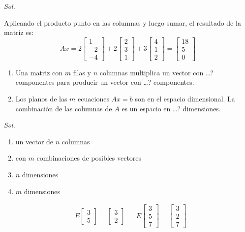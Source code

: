 \textit{ Sol. }

Aplicando el producto punto en las columnas y luego sumar, el resultado de la matriz es:
\begin{equation*}
	Ax= 2\begin{bmatrix}
		1 \\-2\\-4
	\end{bmatrix}+2\begin{bmatrix}
		2 \\3\\1
	\end{bmatrix}+3\begin{bmatrix}
		4 \\1\\2
	\end{bmatrix}=\begin{bmatrix}
		18 \\5\\0
	\end{bmatrix}
\end{equation*}

\begin{problem}
	\begin{enumerate}
		\item  Una matriz con $m$ filas y $n$ columnas multiplica un vector con \dots ? componentes para producir un vector con \dots ? componentes.
		\item Los planos de las $m$ ecuaciones $Ax = b$ son en el espacio dimensional.
		La combinación de las columnas de $A$ es un espacio en \dots? dimensiones.
	\end{enumerate}
\end{problem}

\textit{ Sol. }

\begin{enumerate}
	\item un vector de $n$ columnas
	\item con $m$ combinaciones de posibles vectores
	\item $n$ dimensiones
	\item $m$ dimensiones
\end{enumerate}

\begin{problem}
\begin{align*}
	 & E\begin{bmatrix} 3\\5 \end{bmatrix}= \begin{bmatrix} 3\\2 \end{bmatrix} &  & E\begin{bmatrix} 3\\5\\7 \end{bmatrix}= \begin{bmatrix} 3\\2\\7 \end{bmatrix}
\end{align*}
\end{problem}

